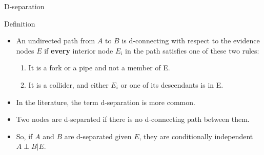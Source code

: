 \documentclass[handout]{beamer}
\begin{document}
\begin{frame}{D-separation}

\begin{block}{Definition}
 \begin{itemize}

\item An undirected path from $A$ to $B$ is d-connecting with respect to the evidence nodes $E$ if \textbf{every} interior node $E_i$ in the path satisfies one of these two rules:

\begin{enumerate}
 \item It is a fork or a pipe and not a member of E.
 \item It is a collider, and either $E_i$ or one of its descendants is in E.
\end{enumerate}
 
 
\end{itemize}

\end{block}



\begin{itemize}


\item In the literature, the term d-separation is more common.

\item Two nodes are d-separated if there is no d-connecting path between them.


\item So, if $A$ and $B$ are d-separated given $E$, they are conditionally independent $A \perp B |E$. 

 
 
\end{itemize}





\end{frame}
\end{document}
